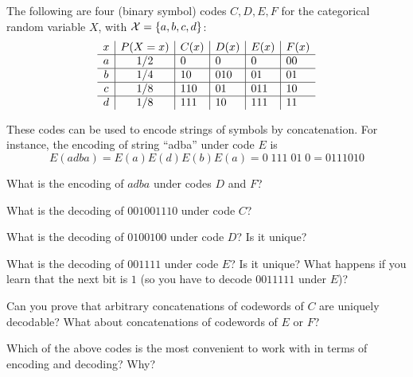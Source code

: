 \documentclass[10pt, a5paper]{scrartcl}
\begin{document}
\begin{exercise}[Codes]
	The following are four (binary symbol) codes $C,D,E, F$ for the categorical random variable $X$, with ${\cal X} = \{a,b,c,d\}$:
	\[
	\begin{array}{c | c | l | l | l | l}
	x & P(X=x) & C(x) & D(x) & E(x) & F(x)\\
	\hline
	a & 1/2 & 0   & 0   & 0   & 00 \\
	\hline
	b & 1/4 & 10  & 010 & 01  & 01\\
	\hline
	c & 1/8 & 110 & 01  & 011 & 10 \\
	\hline
	d & 1/8 & 111 & 10  & 111 & 11 \\
	\end{array}
	\]

	These codes can be used to encode strings of symbols by concatenation. 
	For instance, the encoding of string ``adba'' under code $E$ is
		\[
			E(adba) = E(a) E(d) E(b) E(a) 
					= 0 \; 111 \; 01 \; 0 
					= 0111010
		\]
	\begin{subex}
		What is the encoding of $adba$ under codes $D$ and $F$?	
	\end{subex}
	
	\begin{subex}
		What is the decoding of $001001110$ under code $C$?
	\end{subex}
	
	\begin{subex}
		What is the decoding of $0100100$ under code $D$? 
		Is it unique?
	\end{subex}
	
	\begin{subex}
		What is the decoding of $001111$ under code $E$? 
		Is it unique?
		What happens if you learn that the next bit is $1$ 
		(so you have to decode $0011111$ under $E$)?
	\end{subex}
	
	\begin{subex}
		Can you prove that arbitrary concatenations of codewords of $C$ are uniquely decodable? 
		What about concatenations of codewords of $E$ or $F$?
	\end{subex}
	
	\begin{subex}
		Which of the above codes is the most convenient to work with in terms of encoding and decoding? Why?
	\end{subex}
\end{exercise}
\end{document}
